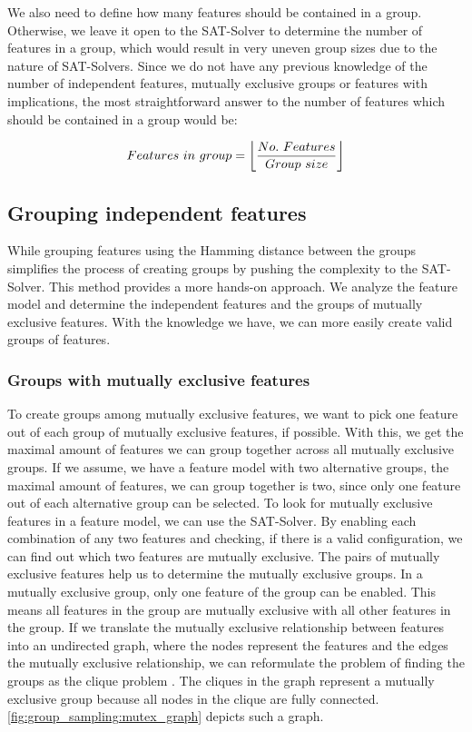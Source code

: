 \documentclass[../../thesis.tex]{subfiles}
\begin{document}
We also need to define how many features should be contained in a group.
Otherwise, we leave it open to the SAT-Solver to determine the number of features in a group, which
would result in very uneven group sizes due to the nature of SAT-Solvers.
Since we do not have any previous knowledge of the number of independent features, mutually exclusive
groups or features with implications, the most straightforward answer to the number of features which
should be contained in a group would be:

\begin{equation} \label{eq:group_sampling:creation_of_groups:hamming:no_of_features}
    Features\ in \ group=\myfloor{\frac{No.\ Features}{Group\ size}}
\end{equation}



\subsection{Grouping independent features}\label{sec:group_sampling:creation_of_groups:mutex}

While grouping features using the Hamming distance between the groups simplifies the process
of creating groups by pushing the complexity to the SAT-Solver. This method provides a more
hands-on approach. We analyze the feature model and determine the independent features
and the groups of mutually exclusive features. With the knowledge we have, we can more easily
create valid groups of features.


\subsubsection{Groups with mutually exclusive features}

To create groups among mutually exclusive features, we want to pick one feature out of each group of
mutually exclusive features, if possible. With this, we get the maximal amount of features we can group
together across all mutually exclusive groups. If we assume, we have a feature model with two alternative groups, the maximal amount of
features, we can group together is two, since only one feature out of each alternative group can be selected.
To look for mutually exclusive features in a feature model, we can use the SAT-Solver.
By enabling each combination of any two features and checking, if there is a valid configuration, we can find out which
two features are mutually exclusive. The pairs of mutually exclusive features help us to determine
the mutually exclusive groups. In a mutually exclusive group, only one feature of the group can be enabled.
This means all features in the group are mutually exclusive with all other features in the group.
If we translate the mutually exclusive relationship between features into an undirected graph,
where the nodes represent the features and the edges the mutually exclusive relationship,
we can reformulate the problem of finding the groups as the clique problem \cite{bron1973algorithm}.
The cliques in the graph represent a mutually exclusive group because all nodes in the clique are fully connected.
\autoref{fig:group_sampling:mutex_graph} depicts such a graph.
\end{document}
